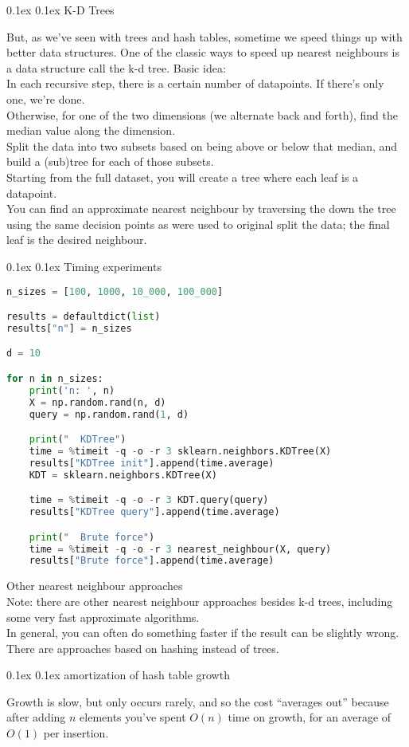 \documentclass[8pt,landscape]{article}
\makeatletter
\renewcommand{\subsection}{\@startsection{subsection}{2}{0pt}%
    {0.1ex}%
    {0.1ex}%
    {\fontsize{8}{9}\bfseries\color{blue}}} %
\newcommand{\smalltext}[1]{%
  {\fontsize{8}{9}\selectfont\sloppy #1\par}%
}
\makeatother
\begin{document}
\begin{multicols}{3}
\subsection{K-D Trees}
\smalltext{
But, as we’ve seen with trees and hash tables, sometime we speed things up with better data structures.
One of the classic ways to speed up nearest neighbours is a data structure call the k-d tree.
Basic idea: \\
In each recursive step, there is a certain number of datapoints. If there’s only one, we’re done.\\
Otherwise, for one of the two dimensions (we alternate back and forth), find the median value along the dimension.\\
Split the data into two subsets based on being above or below that median, and build a (sub)tree for each of those subsets.\\
Starting from the full dataset, you will create a tree where each leaf is a datapoint.\\
You can find an approximate nearest neighbour by traversing the down the tree using the same decision points as were used to original split the data; the final leaf is the desired neighbour.\\
}

\subsection{Timing experiments}
\begin{lstlisting}[language=Python]
n_sizes = [100, 1000, 10_000, 100_000]

results = defaultdict(list)
results["n"] = n_sizes

d = 10

for n in n_sizes:
    print('n: ', n)
    X = np.random.rand(n, d)
    query = np.random.rand(1, d)

    print("  KDTree")
    time = %timeit -q -o -r 3 sklearn.neighbors.KDTree(X)
    results["KDTree init"].append(time.average)
    KDT = sklearn.neighbors.KDTree(X)

    time = %timeit -q -o -r 3 KDT.query(query)
    results["KDTree query"].append(time.average)

    print("  Brute force")
    time = %timeit -q -o -r 3 nearest_neighbour(X, query)
    results["Brute force"].append(time.average)
\end{lstlisting}

\smalltext{
  Other nearest neighbour approaches \\
  Note: there are other nearest neighbour approaches besides k-d trees, including some very fast approximate algorithms.\\
  In general, you can often do something faster if the result can be slightly wrong. \\
  There are approaches based on hashing instead of trees. \\
}

\subsection{amortization of hash table growth}
\smalltext{
  Growth is slow, but only occurs rarely, and so the cost “averages out” because after adding $n$ elements you’ve spent $O(n)$ time on growth, for an average of $O(1)$ per insertion.
}
\end{multicols}
\end{document}
